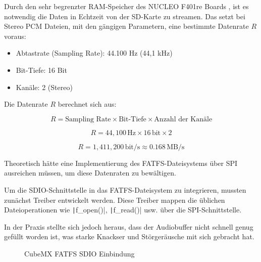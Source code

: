 Durch den sehr begrenzter RAM-Speicher des NUCLEO F401re Boards , ist es notwendig die Daten in Echtzeit von der SD-Karte zu streamen. Das setzt bei Stereo PCM Dateien, mit den gängigen Parametern, eine bestimmte Datenrate \( R \) voraus:

\begin{itemize}
	\item Abtastrate (Sampling Rate): 44.100 Hz (44,1 kHz)
	\item Bit-Tiefe: 16 Bit
	\item Kanäle: 2 (Stereo)
\end{itemize}


Die Datenrate \( R \) berechnet sich aus:

\[
R = \text{Sampling Rate} \times \text{Bit-Tiefe} \times \text{Anzahl der Kanäle}
\]



\[
R = 44{,}100 \, \text{Hz} \times 16 \, \text{bit} \times 2
\]

\[
R = 1{,}411{,}200 \, \text{bit/s} \approx 0.168 \, \text{MB/s}
\]


Theoretisch hätte eine Implementierung des FATFS-Dateisystems über SPI ausreichen müssen, um diese Datenraten zu bewältigen. 

Um die SDIO-Schnittstelle in das FATFS-Dateisystem zu integrieren, mussten zunächst Treiber entwickelt werden. Diese Treiber mappen die üblichen Dateioperationen wie \texttt|f_open()|, \texttt|f_read()| usw. über die SPI-Schnittstelle.


In der Praxis stellte sich jedoch heraus, dass der Audiobuffer nicht schnell genug gefüllt worden ist, was starke Knackser und Störgeräusche mit sich gebracht hat.

\begin{figure} %
	\vspace{-20pt}
	\caption{CubeMX FATFS SDIO Einbindung}
	\label{fig:cubemx_sdio}
\end{figure}

